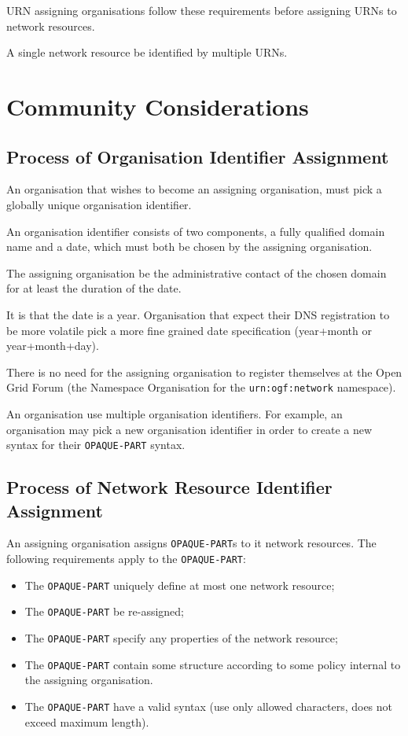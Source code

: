 \documentclass[12pt]{article}  %
\begin{document}
URN assigning organisations \MUST{} follow these requirements before 
assigning URNs to network resources.

A single network resource \MAY{} be identified by multiple URNs. 

\section{Community Considerations}

\subsection{Process of Organisation Identifier Assignment}
\label{sec:orgid-assignment}

An organisation that wishes to become an assigning organisation, must pick a 
globally unique organisation identifier.

An organisation identifier consists of two components, a fully qualified domain 
name and a date, which must both be chosen by the assigning organisation.

The assigning organisation \MUST{} be the administrative contact of the chosen 
domain~\cite{rfc5890} for at least the duration of the date.

It is \RECOMMENDED{} that the date is a year. Organisation that expect their 
DNS registration to be more volatile \SHOULD{} pick a more fine grained date 
specification (year+month or year+month+day).

There is no need for the assigning organisation to register themselves at the 
Open Grid Forum (the Namespace Organisation for the \texttt{urn:ogf:network} namespace).

An organisation \MAY{} use multiple organisation identifiers. 
For example, an organisation may pick a new organisation identifier in order 
to create a new syntax for their \texttt{OPAQUE-PART} syntax.

\subsection{Process of Network Resource Identifier Assignment}

An assigning organisation assigns \texttt{OPAQUE-PART}s to 
it network resources. The following requirements apply to the 
\texttt{OPAQUE-PART}:
\begin{itemize}
    \item The \texttt{OPAQUE-PART} \MUST{} uniquely define at most one network resource;
    \item The \texttt{OPAQUE-PART} \MUSTNOT{} be re-assigned;
    \item The \texttt{OPAQUE-PART} \SHOULDNOT{} specify any properties of the network resource;
    \item The \texttt{OPAQUE-PART} \MAY{} contain some structure according to some policy internal to the assigning organisation.
    \item The \texttt{OPAQUE-PART} \MUST{} have a valid syntax (use only allowed characters, does not exceed maximum length).
\end{itemize}
\end{document}
